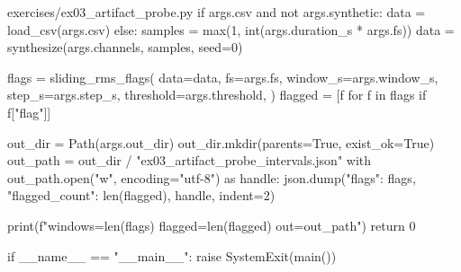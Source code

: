 \documentclass[11pt,openany]{book}
\begin{document}
\begin{filecontents*}{exercises/ex03_artifact_probe.py}
    if args.csv and not args.synthetic:
        data = load_csv(args.csv)
    else:
        samples = max(1, int(args.duration_s * args.fs))
        data = synthesize(args.channels, samples, seed=0)

    flags = sliding_rms_flags(
        data=data,
        fs=args.fs,
        window_s=args.window_s,
        step_s=args.step_s,
        threshold=args.threshold,
    )
    flagged = [f for f in flags if f["flag"]]

    out_dir = Path(args.out_dir)
    out_dir.mkdir(parents=True, exist_ok=True)
    out_path = out_dir / "ex03_artifact_probe_intervals.json"
    with out_path.open("w", encoding="utf-8") as handle:
        json.dump({"flags": flags, "flagged_count": len(flagged)}, handle, indent=2)

    print(f"windows={len(flags)} flagged={len(flagged)} out={out_path}")
    return 0


if __name__ == "__main__":
    raise SystemExit(main())
\end{filecontents*}
\end{document}
